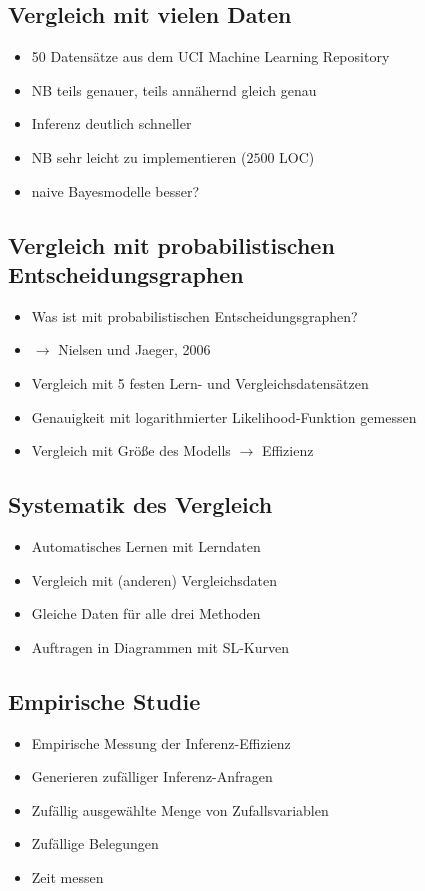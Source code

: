 \documentclass[a5paper,16pt,oneside,landscape]{scrartcl}
\begin{document}
  \subsection*{Vergleich mit vielen Daten}
  \begin{itemize}
    \item 50 Datensätze aus dem UCI Machine Learning Repository
    \item NB teils genauer, teils an­nä­hernd gleich genau
    \item Inferenz deutlich schneller
    \item NB sehr leicht zu implementieren ($2500$ LOC)
    \item naive Bayesmodelle besser?
  \end{itemize}



  \subsection*{Vergleich mit probabilistischen Entscheidungsgraphen}
  \begin{itemize}
    \item Was ist mit probabilistischen Entscheidungsgraphen?
    \item $\rightarrow$ Nielsen und Jaeger, 2006
    \item Vergleich mit 5 festen Lern- und Vergleichsdatensätzen
    \item Genauigkeit mit logarithmierter Likelihood-Funktion gemessen
    \item Vergleich mit Größe des Modells $\rightarrow$ Effizienz
  \end{itemize}



  \subsection*{Systematik des Vergleich}
  \begin{itemize}
    \item Automatisches Lernen mit Lerndaten
    \item Vergleich mit (anderen) Vergleichsdaten
    \item Gleiche Daten für alle drei Methoden
    \item Auftragen in Diagrammen mit SL-Kurven
  \end{itemize}



  \subsection*{Empirische Studie}
  \begin{itemize}
    \item Empirische Messung der Inferenz-Effizienz
    \item Generieren zufälliger Inferenz-Anfragen
    \item Zufällig ausgewählte Menge von Zufallsvariablen
    \item Zufällige Belegungen
    \item Zeit messen
  \end{itemize}
\end{document}
